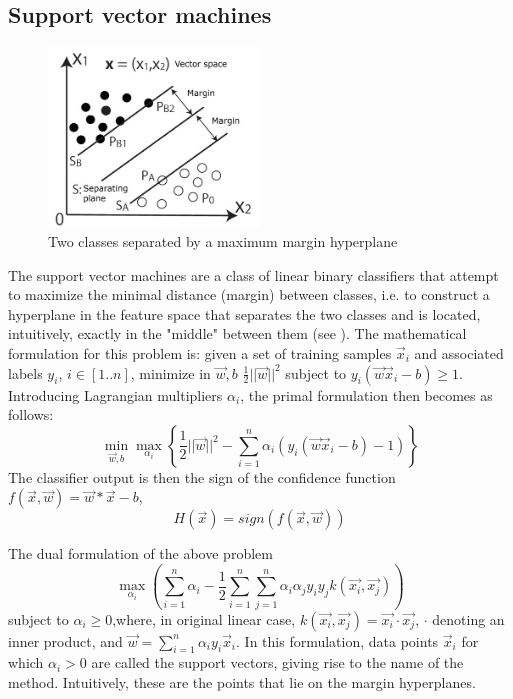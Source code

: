 \subsection{Support vector machines}
\begin{figure}[t]
		\centering
		\includegraphics[width=0.5\textwidth]{margin_sep_lr}
		\caption[Maximum margin separation]{Two classes separated by a maximum margin hyperplane}
		\label{Margin}
	\end{figure}
The support vector machines are a class of linear  binary classifiers that attempt to maximize the minimal distance (margin) between classes, i.e. to construct a hyperplane in the feature space that separates the two classes and is located, intuitively, exactly in the "middle" between them (see ). The mathematical formulation for this problem is: given a set of training samples $\vec{x}_i$ and associated labels $y_i$, $i\in [1..n]$, minimize in $\vec{w},b$ $\frac{1}{2}||\vec{w}||^2$ subject to $y_i(\vec{w}\vec{x}_i-b)\ge 1$. Introducing Lagrangian multipliers $\alpha_i$, the primal formulation then becomes as follows: 
\begin{equation}
\label{simplePrimal}
\min_{\vec{w},b} \max_{\alpha_i}\left\{ \frac{1}{2}||\vec{w}||^2 -\sum_{i=1}^{n}\alpha_i(y_i(\vec{w}\vec{x}_i-b)-1)\right\}
\end{equation}
The classifier output is then the sign of the confidence function $f(\vec{x},\vec{w})=\vec{w}*\vec{x}-b$,
$$
\label{ClassifierOutput}
H(\vec{x})=sign(f(\vec{x},\vec{w}))
$$

The dual formulation of the above problem 
\begin{equation}
\label{simpleDual}
\max_{\alpha_i}\left ( \sum_{i=1}^{n}\alpha_i-\frac{1}{2}\sum_{i=1}^{n}\sum_{j=1}^{n}\alpha_i \alpha_j y_i y_j k(\vec{x_i},\vec{x_j})\right)
\end{equation}
subject to $\alpha_i \ge 0$,where, in original linear case, $k(\vec{x_i},\vec{x_j})=\vec{x_i}\cdot \vec{x_j}$, $\cdot$ denoting an inner product, and $\vec{w}=\sum_{i=1}^{n}\alpha_i y_i \vec{x}_i$. In this formulation, data points $\vec{x}_i$ for which $\alpha_i>0$ are called the support vectors, giving rise to the name of the method. Intuitively, these are the points that lie on the margin hyperplanes. 

